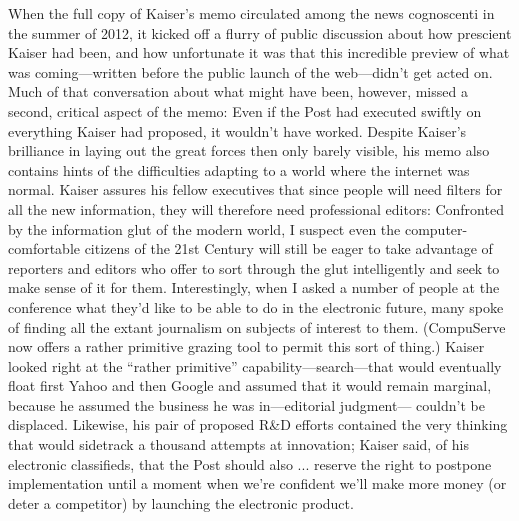 When the full copy of Kaiser’s memo circulated among the news cognoscenti in
the summer of 2012, it kicked off a flurry of public discussion about how prescient
Kaiser had been, and how unfortunate it was that this incredible preview
of what was coming—written before the public launch of the web—didn’t get
acted on.
Much of that conversation about what might have been, however, missed a second,
critical aspect of the memo: Even if the Post had executed swiftly on everything
Kaiser had proposed, it wouldn’t have worked. Despite Kaiser’s brilliance in
laying out the great forces then only barely visible, his memo also contains hints
of the difficulties adapting to a world where the internet was normal.
Kaiser assures his fellow executives that since people will need filters for all the
new information, they will therefore need professional editors:
Confronted by the information glut of the modern world, I suspect even
the computer-comfortable citizens of the 21st Century will still be eager
to take advantage of reporters and editors who offer to sort through the
glut intelligently and seek to make sense of it for them. Interestingly,
when I asked a number of people at the conference what they’d like to
be able to do in the electronic future, many spoke of finding all the extant
journalism on subjects of interest to them. (CompuServe now offers
a rather primitive grazing tool to permit this sort of thing.)
Kaiser looked right at the ``rather primitive'' capability—search—that would
eventually float first Yahoo and then Google and assumed that it would remain
marginal, because he assumed the business he was in—editorial judgment—
couldn’t be displaced. Likewise, his pair of proposed R&D efforts contained the
very thinking that would sidetrack a thousand attempts at innovation; Kaiser said,
of his electronic classifieds, that the Post should also
... reserve the right to postpone implementation until a moment when
we’re confident we’ll make more money (or deter a competitor) by
launching the electronic product.

